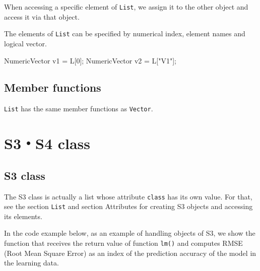 \documentclass[]{book}
\newenvironment{Shaded}{\begin{snugshade}}{\end{snugshade}}
\newcommand{\DecValTok}[1]{\textcolor[rgb]{0.00,0.00,0.81}{#1}}
\newcommand{\StringTok}[1]{\textcolor[rgb]{0.31,0.60,0.02}{#1}}
\newcommand{\NormalTok}[1]{#1}
\theoremstyle{definition}
\theoremstyle{definition}
\theoremstyle{remark}
\begin{document}
When accessing a specific element of \texttt{List}, we assign it to the
other object and access it via that object.

The elements of \texttt{List} can be specified by numerical index,
element names and logical vector.

\begin{Shaded}
\begin{Highlighting}[]
\NormalTok{NumericVector v1 = L[}\DecValTok{0}\NormalTok{];}
\NormalTok{NumericVector v2 = L[}\StringTok{"V1"}\NormalTok{];}
\end{Highlighting}
\end{Shaded}

\section{Member functions}\label{member-functions-3}

\texttt{List} has the same member functions as \texttt{Vector}.

\chapter{S3・S4 class}\label{s3s4-class}

\section{S3 class}\label{s3-class}

The S3 class is actually a list whose attribute \texttt{class} has its
own value. For that, see the section \texttt{List} and section
Attributes for creating S3 objects and accessing its elements.

In the code example below, as an example of handling objects of S3, we
show the function that receives the return value of function
\texttt{lm()} and computes RMSE (Root Mean Square Error) as an index of
the prediction accuracy of the model in the learning data.
\end{document}
